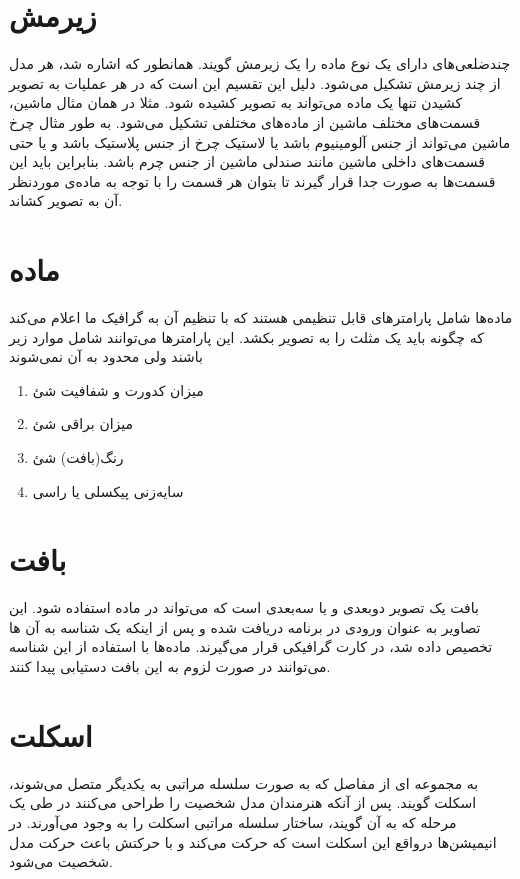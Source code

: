\section{زیرمش
\protect{}
}
چندضلعی‌های دارای یک نوع ماده
را یک زیرمش گویند.
همانطور که اشاره شد، هر مدل از چند زیرمش تشکیل می‌شود. دلیل این تقسیم این است که در هر عملیات به تصویر کشیدن
تنها یک ماده می‌تواند به تصویر کشیده شود. مثلا در همان مثال ماشین، قسمت‌های مختلف ماشین از ماده‌های مختلفی تشکیل می‌شود. به طور مثال چرخ ماشین می‌تواند از جنس آلومینیوم باشد یا لاستیک چرخ از جنس پلاستیک باشد و یا حتی قسمت‌های داخلی ماشین مانند صندلی ماشین از جنس چرم باشد.
بنابراین باید این قسمت‌ها به صورت جدا قرار گیرند تا بتوان هر قسمت را با توجه به ماده‌ی موردنظر آن به تصویر کشاند.

\section{ماده 
\protect{}
}
ماده‌ها شامل پارامتر‌های قابل تنظیمی هستند که با تنظیم آن به گرافیک ما اعلام می‌کند که چگونه باید یک مثلث را به تصویر بکشد.
این پارامترها می‌توانند شامل موارد زیر باشند ولی محدود به آن نمی‌شوند

\begin{enumerate}
	\item میزان کدورت و شفافیت شئ
 	\item میزان براقی شئ
 	\item رنگ(بافت) شئ
 	\item سایه‌زنی پیکسلی یا راسی \protect{}
\end{enumerate}


\section{بافت
\protect{}
}
بافت یک تصویر دوبعدی و یا سه‌بعدی است که می‌تواند در ماده استفاده شود.
این تصاویر به عنوان ورودی در برنامه دریافت شده و پس از اینکه یک شناسه به آن ها تخصیص داده شد، در کارت گرافیکی قرار می‌گیرند. ماده‌ها با استفاده از این شناسه می‌توانند در صورت لزوم به این بافت دستیابی پیدا کنند.


\section{اسکلت}

به مجمو‌عه ای از مفاصل که به صورت سلسله مراتبی به یکدیگر متصل می‌شوند، اسکلت گویند. پس از آنکه هنرمندان مدل شخصیت را طراحی می‌کنند در طی یک مرحله که به آن
گویند، ساختار سلسله مراتبی اسکلت را به وجود می‌آورند.
در انیمیشن‌ها درواقع این اسکلت‌ است که حرکت می‌کند و با حرکتش باعث حرکت مدل شخصیت می‌شود.


